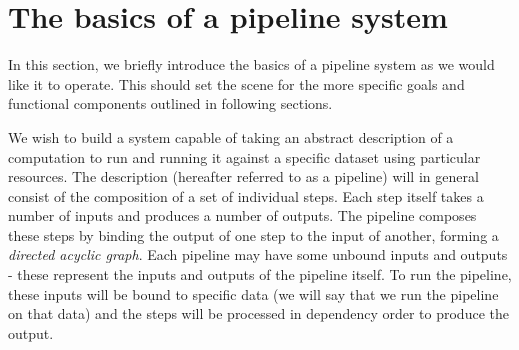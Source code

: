 \documentclass[10pt,a4paper]{article}
\newcommand{\npar}{\par\noindent\space}
\begin{document}
\section{The basics of a pipeline system}
\npar In this section, we briefly introduce the basics of a pipeline system as we would like it to operate. This should set the scene for the more specific goals and functional components outlined in following sections.
\npar We wish to build a system capable of taking an abstract description of a computation to run and running it against a specific dataset using particular resources. The description (hereafter referred to as a \gls{pipeline}) will in general consist of the composition of a set of individual steps. Each step itself takes a number of inputs and produces a number of outputs. The pipeline composes these steps by binding the output of one step to the input of another, forming a \textit{directed acyclic graph}. Each pipeline may have some unbound inputs and outputs - these represent the inputs and outputs of the pipeline itself. To run the pipeline, these inputs will be bound to specific data (we will say that we run the pipeline on that data) and the steps will be processed in dependency order to produce the output.
\end{document}
